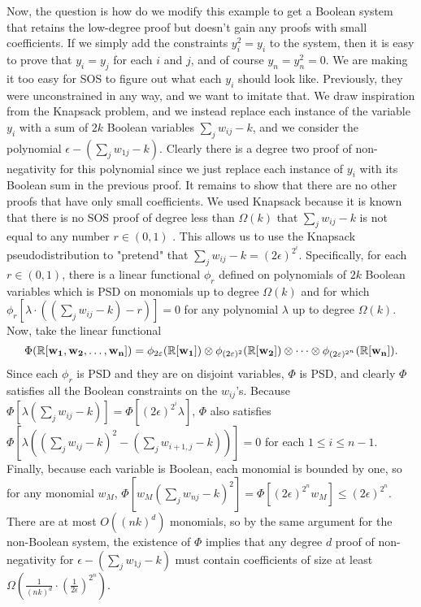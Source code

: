 Now, the question is how do we modify this example to get a Boolean system that retains the low-degree proof but doesn't gain any proofs with small coefficients. If we simply add the constraints $y_i^2 = y_i$ to the system, then it is easy to prove that $y_i = y_j$ for each $i$ and $j$, and of course $y_n = y_n^2 = 0$. We are making it too easy for SOS to figure out what each $y_i$ should look like. Previously, they were unconstrained in any way, and we want to imitate that. We draw inspiration from the Knapsack problem, and we instead replace each instance of the variable $y_i$ with a sum of $2k$ Boolean variables $\sum_j w_{ij} - k$, and we consider the polynomial $\epsilon - (\sum_j w_{1j} - k)$. Clearly there is a degree two proof of non-negativity for this polynomial since we just replace each instance of $y_i$ with its Boolean sum in the previous proof. It remains to show that there are no other proofs that have only small coefficients. We used Knapsack because it is known that there is no SOS proof of degree less than $\Omega(k)$ that $\sum_j w_{ij} - k$ is not equal to any number $r \in (0,1)$ \cite{}. This allows us to use the Knapsack pseudodistribution to "pretend" that $\sum_j w_{ij} - k = (2\epsilon)^{2^i}$. Specifically, for each $r \in (0,1)$, there is a linear functional $\phi_r$ defined on polynomials of $2k$ Boolean variables which is PSD on monomials up to degree $\Omega(k)$ and for which $\phi_r[\lambda\cdot((\sum_j w_{ij} - k) - r)] = 0$ for any polynomial $\lambda$ up to degree $\Omega(k)$. Now, take the linear functional 
\[\Phi(\mathbb R[{\bf w_1}, {\bf w_2}, \dots, {\bf w_n}]) = \phi_{2\varepsilon}(\mathbb R[{\bf w_1}]) \otimes \phi_{(2\varepsilon)^2}(\mathbb R[{\bf w_2}])\otimes \dots \otimes \phi_{(2\varepsilon)^{2^n}}(\mathbb R[{\bf w_n}]).\]
Since each $\phi_r$ is PSD and they are on disjoint variables, $\Phi$ is PSD, and clearly $\Phi$ satisfies all the Boolean constraints on the $w_{ij}$'s. Because $\Phi[\lambda(\sum_j w_{ij} - k)] = \Phi[(2\epsilon)^{2^i}\lambda]$, $\Phi$ also satisfies $\Phi[\lambda((\sum_j w_{ij}-k)^2 - (\sum_j w_{i+1,j} - k))] = 0$ for each $1 \leq i \leq n-1$. Finally, because each variable is Boolean, each monomial is bounded by one, so for any monomial $w_M$, $\Phi[w_M(\sum_j w_{nj} - k)^2] = \Phi[(2\epsilon)^{2^n} w_M] \leq (2\epsilon)^{2^n}$. There are at most $O((nk)^d)$ monomials, so by the same argument for the non-Boolean system, the existence of $\Phi$ implies that any degree $d$ proof of non-negativity for $\epsilon - (\sum_j w_{1j} - k)$ must contain coefficients of size at least $\Omega(\frac{1}{(nk)^d} \cdot \left(\frac{1}{2\epsilon}\right)^{2^n})$.

